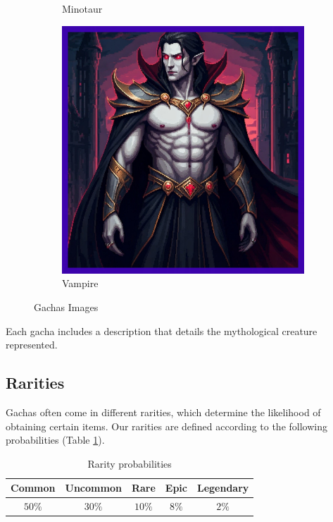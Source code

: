 \documentclass{article}
\begin{document}
\begin{figure}[h!]
\begin{subfigure}[b]{0.3\textwidth}
        \caption{Minotaur}
        \label{fig:minotaur}
    \end{subfigure}
    \hfill
    \begin{subfigure}[b]{0.3\textwidth}
        \centering
        \includegraphics[width=\textwidth]{gachas/final/Vampire (epic).jpg}
        \caption{Vampire}
        \label{fig:vampire}
    \end{subfigure}
    \caption{Gachas Images}
    \label{fig:gachas_images}
\end{figure}

Each gacha includes a description that details the mythological creature represented.

\subsection{Rarities}
Gachas often come in different rarities, which determine the likelihood of obtaining certain items. Our rarities are defined according to the following probabilities (Table \ref{tab:rarity}).

\begin{table}[ht!]
    \centering
    \begin{tabular}{|c|c|c|c|c|}
        \hline
        \textbf{Common} & \textbf{Uncommon} & \textbf{Rare} & \textbf{Epic} & \textbf{Legendary} \\
        \hline
        $50\%$          & $30\%$            & $10\%$        & $8\%$         & $2\%$              \\
        \hline
    \end{tabular}
    \caption{Rarity probabilities}
    \label{tab:rarity}
\end{table}
\end{document}
